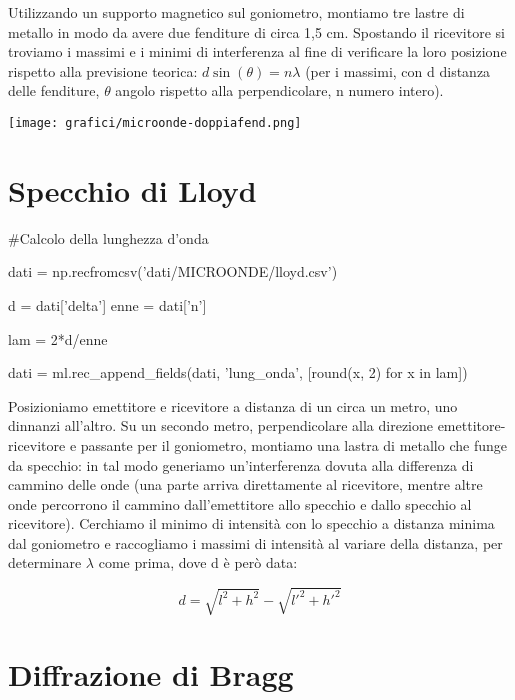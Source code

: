 Utilizzando un supporto magnetico sul goniometro, montiamo tre lastre di metallo in modo da avere due
fenditure di circa 1,5 cm. Spostando il ricevitore si troviamo i massimi e i minimi di interferenza al fine di verificare la
loro posizione rispetto alla previsione teorica: $d \sin(\theta) = n \lambda$ (per i massimi, con d distanza delle fenditure, $\theta$ angolo
rispetto alla perpendicolare, n numero intero).

\begin{center}
\texttt{[image: grafici/microonde-doppiafend.png]}
\end{center}

\section{Specchio di Lloyd}

\begin{sagesilent}
#Calcolo della lunghezza d'onda

dati = np.recfromcsv('dati/MICROONDE/lloyd.csv')

d = dati['delta']
enne = dati['n']

lam = 2*d/enne


dati = ml.rec_append_fields(dati, 'lung_onda', [round(x, 2) for x in lam])

\end{sagesilent}

Posizioniamo emettitore e ricevitore a distanza di un circa un metro, uno dinnanzi all'altro. Su un secondo metro, perpendicolare alla direzione emettitore-ricevitore e passante per il goniometro, montiamo una lastra di metallo che funge da specchio: in tal modo generiamo un'interferenza dovuta alla differenza di cammino delle onde (una parte arriva direttamente al ricevitore, mentre altre onde percorrono il cammino dall'emettitore allo specchio e dallo specchio al ricevitore). Cerchiamo il minimo di intensità con lo specchio a distanza minima dal goniometro e raccogliamo i massimi di intensità al variare della distanza, per determinare $\lambda$ come prima, dove d è però data:

$$ d = \sqrt{l^2 + h^2} - \sqrt{l'^2 + h'^2} $$

\begin{center}
\end{center}

\section{Diffrazione di Bragg}


